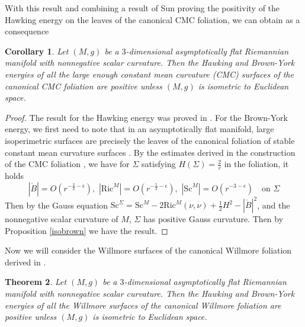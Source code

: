 \documentclass[12pt,a4paper]{amsart}
\theoremstyle{plain}
\newtheorem{theorem}{Theorem}[section]
\newtheorem{corollary}[theorem]{Corollary}
\theoremstyle{definition}
\begin{document}
With this result and combining a result of Sun proving the positivity of the Hawking energy on the leaves of the canonical CMC foliation, we can obtain as a consequence
\begin{corollary}
     Let \((M, g)\) be a $3$-dimensional asymptotically flat  Riemannian manifold with nonnegative  scalar curvature. Then the Hawking  and  Brown-York energies of all the large enough constant mean curvature (CMC) surfaces of the canonical CMC foliation are positive unless $(M,g)$ is isometric to Euclidean space.
\end{corollary}
\begin{proof}
    The result for the Hawking energy was proved in \cite[Corollary 2]{sun2017rigidity}. For the Brown-York energy, we first need to note that  in an asymptotically flat manifold, large isoperimetric surfaces are precisely the leaves of the canonical foliation of stable constant mean curvature surfaces \cite{eichmair2013large, Eich}. By the estimates derived in the construction of the CMC foliation \cite{Nerz2}, we have  for $\Sigma$ satisfying $H(\Sigma)= \frac{2}{r}$ in the foliation, it holds 
$$ |\mathring{B}|= O(r^{-\frac{3}{2}-\epsilon}), \, \,  |\mathrm{Ric}^M|= O(r^{-\frac{5}{2}-\epsilon}), \,\,|\mathrm{Sc}^M |=O(r^{-3-\epsilon}) \quad \text{on $\Sigma$} $$
Then by the Gauss equation $\mathrm{Sc}^{\Sigma} = \mathrm{Sc}^{M} - 2\mathrm{Ric}^M(\nu, \nu) + \frac{1}{2}H^2 - |\mathring{B}|^2 $, and the nonnegative scalar curvature of $M$, $\Sigma$ has positive Gauss curvature. Then by Proposition \ref{isobrown} we have the result. 
\end{proof}
Now we will consider the Willmore surfaces of the canonical Willmore foliation derived in \cite{eichko, willflat}.
\begin{theorem}\label{rigidityfoli}
    Let \((M, g)\) be a $3$-dimensional asymptotically flat  Riemannian manifold with nonnegative  scalar curvature. Then the Hawking  and  Brown-York energies of all the  Willmore surfaces of the canonical Willmore foliation  are positive unless $(M,g)$ is isometric to Euclidean space.
\end{theorem}
\end{document}
